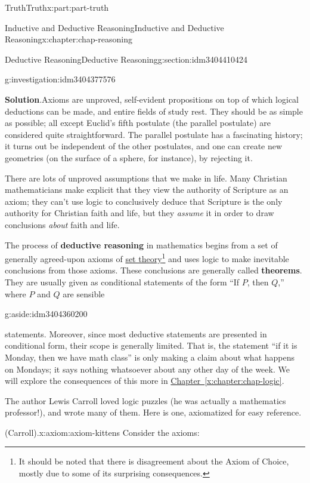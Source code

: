 \documentclass[oneside,10pt,]{book}
\newcommand{\blocktitlefont}{\relax}
\newcommand{\xreffont}{\relax}
\newcommand{\terminology}[1]{\textbf{#1}}
\numberwithin{equation}{section}
\begin{document}
\begin{partptx}{Truth}{}{Truth}{}{}{x:part:part-truth}
\begin{chapterptx}{Inductive and Deductive Reasoning}{}{Inductive and Deductive Reasoning}{}{}{x:chapter:chap-reasoning}
\begin{sectionptx}{Deductive Reasoning}{}{Deductive Reasoning}{}{}{g:section:idm3404410424}
\begin{investigation}{}{g:investigation:idm3404377576}
\par\smallskip%
\noindent\textbf{\blocktitlefont Solution}.\hypertarget{g:solution:idm3404366856}{}\quad{}Axioms are unproved, self-evident propositions on top of which logical deductions can be made, and entire fields of study rest. They should be as simple as possible; all except Euclid's fifth postulate (the parallel postulate) are considered quite straightforward. The parallel postulate has a fascinating history; it turns out be independent of the other postulates, and one can create new geometries (on the surface of a sphere, for instance), by rejecting it.%
\par
There are lots of unproved assumptions that we make in life. Many Christian mathematicians make explicit that they view the authority of Scripture as an axiom; they can't use logic to conclusively deduce that Scripture is the only authority for Christian faith and life, but they \emph{assume} it in order to draw conclusions \emph{about} faith and life.%
\end{investigation}%
The process of \terminology{deductive reasoning} in mathematics begins from a set of generally agreed-upon axioms of \href{https://en.wikipedia.org/wiki/Zermelo–Fraenkel_set_theory}{set theory}\footnote{It should be noted that there is disagreement about the Axiom of Choice, mostly due to some of its surprising consequences.\label{g:fn:idm3404363384}} and uses logic to make inevitable conclusions from those axioms. These conclusions are generally called \terminology{theorems}. They are usually given as conditional statements of the form ``If \(P\), then \(Q\),'' where \(P\) and \(Q\) are sensible\begin{aside}{}{g:aside:idm3404360200}%
\end{aside}
 statements. Moreover, since most deductive statements are presented in conditional form, their scope is generally limited. That is, the statement ``if it is Monday, then we have math class'' is only making a claim about what happens on Mondays; it says nothing whatsoever about any other day of the week. We will explore the consequences of this more in \hyperref[x:chapter:chap-logic]{Chapter~{\xreffont\ref{x:chapter:chap-logic}}}.%
\par
The author Lewis Carroll loved logic puzzles (he was actually a mathematics professor!), and wrote many of them. Here is one, axiomatized for easy reference.%
\begin{axiom}{(Carroll).}{}{x:axiom:axiom-kittens}%
Consider the axioms:%
%
\begin{enumerate}

\end{enumerate}
\end{axiom}
\end{sectionptx}
\end{chapterptx}
\end{partptx}
\end{document}
